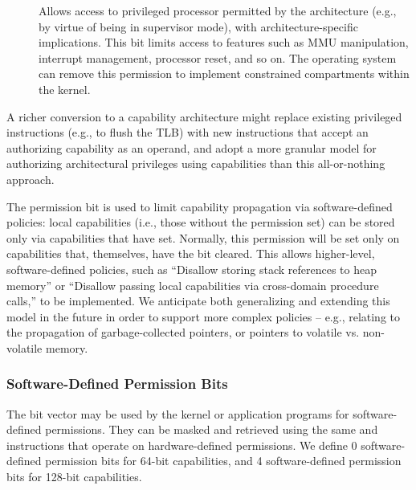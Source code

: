 \begin{description}
\item[\cappermASR*] Allows access to privileged processor
  permitted by the architecture (e.g., by virtue of being in supervisor mode),
  with architecture-specific implications.
  This bit limits access to features such as MMU manipulation, interrupt
  management, processor reset, and so on.
  The operating system can remove this permission to implement constrained
  compartments within the kernel.
\end{description}

A richer conversion to a capability architecture might replace existing
privileged instructions (e.g., to flush the TLB) with new instructions that
accept an authorizing capability as an operand, and adopt a more granular
model for authorizing architectural privileges using capabilities than this
all-or-nothing approach.

The \cappermSLC permission bit is used to limit
capability propagation via software-defined policies: local capabilities
(i.e., those without the \cappermG permission set) can be stored only via
capabilities that have \cappermSLC set.
Normally, this permission will be set only on capabilities that, themselves,
have the \cappermG bit cleared.
This allows higher-level, software-defined policies, such as ``Disallow storing stack references to heap memory'' or ``Disallow passing local capabilities via cross-domain procedure calls,'' to be implemented.
We anticipate both generalizing and extending this model in the future in
order to support more complex policies -- e.g., relating to the propagation of
garbage-collected pointers, or pointers to volatile vs. non-volatile memory.

\subsubsection{Software-Defined Permission Bits}

The \cuperms{} bit vector may be used by the kernel or application programs
for software-defined permissions.
They can be masked and retrieved using the same  and
 instructions that operate on hardware-defined
permissions.
We define 0 software-defined permission bits for 64-bit capabilities, and 4
software-defined permission bits for 128-bit capabilities.

